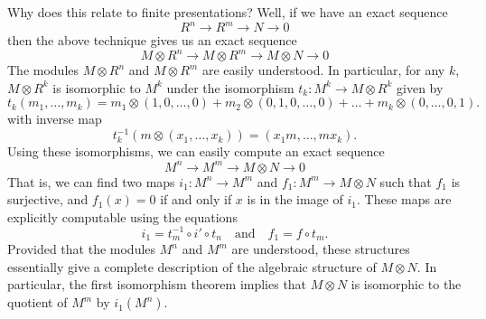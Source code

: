 \documentclass{article}
\theoremstyle{plain}
\theoremstyle{remark}
\theoremstyle{definition}
\begin{document}
Why does this relate to finite presentations? Well, if we have an exact sequence
%
\[ R^n \to R^m \to N \to 0 \]
%
then the above technique gives us an exact sequence
%
\[ M \otimes R^n \to M \otimes R^m \to M \otimes N \to 0 \]
%
The modules $M \otimes R^n$ and $M \otimes R^m$ are easily understood. In particular, for any $k$, $M \otimes R^k$ is isomorphic to $M^k$ under the isomorphism $t_k: M^k \to M \otimes R^k$ given by
%
\[ t_k(m_1,\dots,m_k) = m_1 \otimes (1,0,\dots,0) + m_2 \otimes (0,1,0,\dots,0) + \dots + m_k \otimes (0,\dots,0,1). \]
%
with inverse map
%
\[ t_k^{-1}(m \otimes (x_1,\dots,x_k)) = (x_1m, \dots, mx_k). \]
%
Using these isomorphisms, we can easily compute an exact sequence
%
\[ M^n \to M^m \to M \otimes N \to 0 \]
%
That is, we can find two maps $i_1: M^n \to M^m$ and $f_1: M^m \to M \otimes N$ such that $f_1$ is surjective, and $f_1(x) = 0$ if and only if $x$ is in the image of $i_1$. These maps are explicitly computable using the equations
%
\[ i_1 = t_m^{-1} \circ i' \circ t_n \quad\text{and}\quad f_1 = f \circ t_m. \]
%
Provided that the modules $M^n$ and $M^m$ are understood, these structures essentially give a complete description of the algebraic structure of $M \otimes N$. In particular, the first isomorphism theorem implies that $M \otimes N$ is isomorphic to the quotient of $M^m$ by $i_1(M^n)$.
\end{document}

